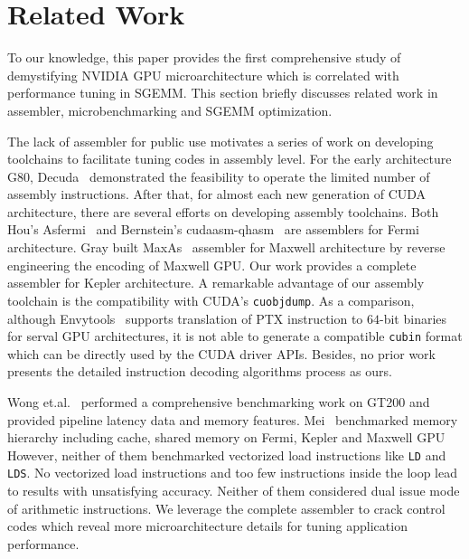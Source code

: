 \section{Related Work}
\label{sec:related}
To our knowledge, this paper provides the first comprehensive study of demystifying NVIDIA GPU microarchitecture which 
is correlated with performance tuning in SGEMM. This section briefly discusses related work in assembler, 
microbenchmarking and SGEMM optimization.

The lack of assembler for public use motivates a series of work on developing toolchains to facilitate tuning codes in 
assembly level. For the early architecture G80, Decuda~\cite{decuda} demonstrated the feasibility to operate the 
limited number of assembly instructions. After that, for almost each new generation of CUDA architecture, there are several 
efforts on developing assembly toolchains. Both Hou's Asfermi~\cite{asfermi} and Bernstein's 
cudaasm-qhasm~\cite{bernstein2012usable} are assemblers for Fermi architecture. Gray built MaxAs~\cite{maxas} assembler 
for Maxwell architecture by reverse engineering the encoding of Maxwell GPU. Our work provides a complete assembler for 
Kepler architecture. A remarkable advantage of our assembly toolchain is the compatibility with CUDA's {\tt cuobjdump}. 
As a comparison, although Envytools~\cite{envytools} supports translation of PTX instruction to $64$-bit binaries 
for serval GPU architectures, it is not able to generate a compatible {\tt cubin} format which can be directly used by 
the CUDA driver APIs. Besides, no prior work presents the detailed instruction decoding algorithms process as ours.

Wong et.al.~\cite{wong} performed a 
comprehensive benchmarking work on GT200 and provided pipeline latency data and
memory features. Mei~\cite{mei} benchmarked memory hierarchy including cache, shared memory on Fermi, Kepler and Maxwell GPU
However, neither of them benchmarked 
vectorized load instructions like {\tt LD} and {\tt LDS}. 
No vectorized load instructions and too few instructions inside the loop lead to results with unsatisfying accuracy.
Neither of them considered dual issue mode of 
arithmetic instructions. We leverage the complete assembler to crack control codes which reveal more 
microarchitecture details for tuning application performance.

